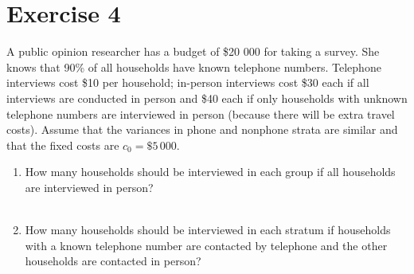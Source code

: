\documentclass[12pt]{article}
\begin{document}
\section*{Exercise 4}
A public opinion researcher has a budget of \$20 000 for taking a survey. She knows that 90\% of all households have known telephone numbers. Telephone interviews cost \$10 per household; in-person interviews cost \$30 each if all interviews are conducted in person and \$40 each if only households with unknown telephone numbers are interviewed in person (because there will be extra travel costs). Assume that the variances in phone and nonphone strata are similar and that the fixed costs are $c_0 = \$5\,000$.  
\begin{enumerate}
\item How many households should be interviewed in each group if all households are interviewed in person?\\
\\
\item How many households should be interviewed in each stratum if households with a known telephone number are contacted by telephone and the other households are contacted in person?\\
\end{enumerate}
\end{document}
